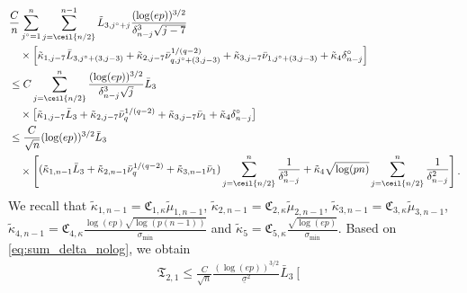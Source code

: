 \documentclass[aos]{imsart}
\begin{document}
\begin{appendix}
\begin{equation*}
\begin{aligned}
    & \frac{C}{n} \sum_{j^\circ=1}^{n} \sum_{j=\ceil{n/2}}^{n-1} \tilde L_{3,j^\circ+j} \frac{(\log(ep))^{3/2}}{\delta_{n-j}^3 \sqrt{j-7}} \\
    & \quad \times \left[ \begin{aligned}
        & \tilde\kappa_{1,j-7} \bar{L}_{3,j^\circ+(3,j-3)}
        + \tilde\kappa_{2,j-7} \bar\nu_{q,j^\circ+(3,j-3)}^{1/(q-2)}
        + \tilde\kappa_{3,j-7} \bar\nu_{1,j^\circ+(3,j-3)}
        + \tilde\kappa_{4} \delta_{n-j}^\circ \\
    \end{aligned} \right]
    \\
    & \leq C \sum_{j=\ceil{n/2}}^{n} \frac{(\log(ep))^{3/2}}{\delta_{n-j}^3 \sqrt{j}} \bar{L}_{3} \\
    & \quad \times \left[ \begin{aligned}
        \tilde\kappa_{1,j-7} \bar{L}_{3}
        + \tilde\kappa_{2,j-7} \bar\nu_{q}^{1/(q-2)}
        + \tilde\kappa_{3,j-7} \bar\nu_{1}
        + \tilde\kappa_{4} \delta_{n-j}^\circ \\
    \end{aligned} \right]
    \\
    & \leq \frac{C}{\sqrt{n}} (\log(ep))^{3/2} \bar{L}_{3} \\
    & \quad \times \left[ \begin{aligned}
        (\tilde\kappa_{1,n-1} \bar{L}_{3} 
        + \tilde\kappa_{2,n-1} \bar\nu_{q}^{1/(q-2)}
        + \tilde\kappa_{3,n-1} \bar\nu_{1}) 
        \sum_{j=\ceil{n/2}}^n \frac{1}{\delta_{n-j}^3} 
        + \tilde\kappa_4 \sqrt{\log(p n)} 
        \sum_{j=\ceil{n/2}}^{n} \frac{1}{\delta_{n-j}^2}
    \end{aligned} \right].
\end{aligned}
\end{equation*}
We recall that $\tilde\kappa_{1,n-1} = \mathfrak{C}_{1,\kappa} \tilde\mu_{1,n-1}$, $\tilde\kappa_{2,n-1} = \mathfrak{C}_{2,\kappa} \tilde\mu_{2,n-1}$, $\tilde\kappa_{3,n-1} = \mathfrak{C}_{3,\kappa} \tilde\mu_{3,n-1}$, $\tilde\kappa_{4,n-1} = \mathfrak{C}_{4,\kappa} \frac{\log(ep)\sqrt{\log(p(n-1))}}{\sigma_{\min}}$ and $\tilde\kappa_{5} = \mathfrak{C}_{5,\kappa} \frac{\sqrt{\log(ep)}}{\sigma_{\min}}$. 
Based on \cref{eq:sum_delta_nolog}, we obtain
\begin{equation*}
\begin{aligned}
    \mathfrak{T}_{2,1} 
    \leq \frac{C}{\sqrt{n}} \frac{(\log(ep))^{3/2}}{\underline{\sigma}^2} \bar{L}_{3}
    \left[ \begin{aligned}

\end{aligned}
\end{aligned}
\end{equation*}
\end{appendix}
\end{document}
